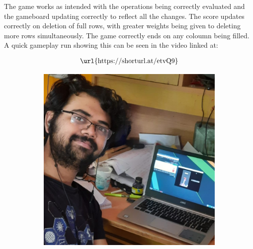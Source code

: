 
The game works as intended with the operations being correctly evaluated
 and the gameboard updating correctly to reflect all the changes. The score updates correctly on deletion of full rows, with greater weights 
being given to deleting more rows simultaneously. The game correctly ends on any coloumn being filled. \\
A quick gameplay run showing this can be seen in the video linked at:

\begin{align}
    \centering
    \textnormal{\url{https://shorturl.at/etvQ9}} \nonumber
\end{align}

\begin{figure}[ht]
    \centering
    \begin{subfigure}[b]{0.4\textwidth}
        \centering
        \includegraphics[width=\textwidth]{fig/demo-pushk.jpeg}
    \end{subfigure}
%
    \begin{subfigure}[b]{0.4\textwidth}
        \centering

\end{subfigure}
\end{figure}
